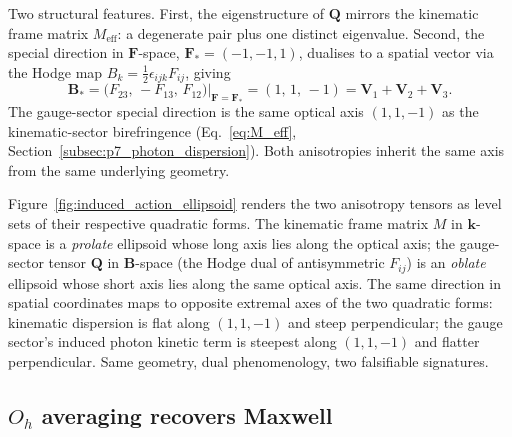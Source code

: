 Two structural features.  First, the eigenstructure of $\mathbf{Q}$
mirrors the kinematic frame matrix $M_\text{eff}$: a degenerate pair
plus one distinct eigenvalue.  Second, the special direction in
$\mathbf{F}$-space, $\mathbf{F}_* = (-1, -1, 1)$, dualises to a
spatial vector via the Hodge map
$B_k = \tfrac{1}{2}\epsilon_{ijk}F_{ij}$, giving
\begin{equation}
    \mathbf{B}_*
        = \bigl(F_{23},\, -F_{13},\, F_{12}\bigr)\big|_{\mathbf{F}=\mathbf{F}_*}
        = (1,\, 1,\, -1)
        = \mathbf{V}_1 + \mathbf{V}_2 + \mathbf{V}_3.
    \label{eq:optical_axis_recovered}
\end{equation}
The gauge-sector special direction is the same optical axis
$(1, 1, -1)$ as the kinematic-sector birefringence
(Eq.~\ref{eq:M_eff}, Section~\ref{subsec:p7_photon_dispersion}).
Both anisotropies inherit the same axis from the same underlying
geometry.

Figure~\ref{fig:induced_action_ellipsoid} renders the two anisotropy
tensors as level sets of their respective quadratic forms.  The
kinematic frame matrix $M$ in $\mathbf{k}$-space is a \emph{prolate}
ellipsoid whose long axis lies along the optical axis; the
gauge-sector tensor $\mathbf{Q}$ in $\mathbf{B}$-space (the Hodge
dual of antisymmetric $F_{ij}$) is an \emph{oblate} ellipsoid whose
short axis lies along the same optical axis.  The same direction in
spatial coordinates maps to opposite extremal axes of the two
quadratic forms: kinematic dispersion is flat along $(1,1,-1)$ and
steep perpendicular; the gauge sector's induced photon kinetic term
is steepest along $(1,1,-1)$ and flatter perpendicular.  Same
geometry, dual phenomenology, two falsifiable signatures.

\begin{figure}[h]
\centering

\end{figure}

\subsection{$O_h$ averaging recovers Maxwell}
\label{subsec:induced_maxwell}

